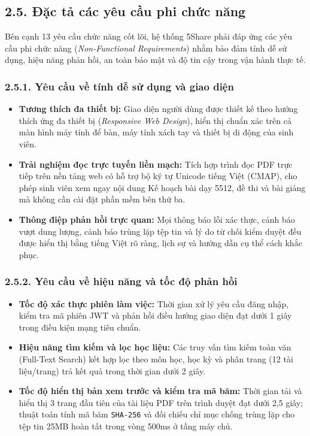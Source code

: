 \subsection{2.5. Đặc tả các yêu cầu phi chức năng}
Bên cạnh 13 yêu cầu chức năng cốt lõi, hệ thống 5Share phải đáp ứng các yêu cầu phi chức năng (\textit{Non-Functional Requirements}) nhằm bảo đảm tính dễ sử dụng, hiệu năng phản hồi, an toàn bảo mật và độ tin cậy trong vận hành thực tế.

\subsubsection{2.5.1. Yêu cầu về tính dễ sử dụng và giao diện}
\begin{itemize}[leftmargin=*,noitemsep]
    \item \textbf{Tương thích đa thiết bị:} Giao diện người dùng được thiết kế theo hướng thích ứng đa thiết bị (\textit{Responsive Web Design}), hiển thị chuẩn xác trên cả màn hình máy tính để bàn, máy tính xách tay và thiết bị di động của sinh viên.
    \item \textbf{Trải nghiệm đọc trực tuyến liền mạch:} Tích hợp trình đọc PDF trực tiếp trên nền tảng web có hỗ trợ bộ ký tự Unicode tiếng Việt (CMAP), cho phép sinh viên xem ngay nội dung Kế hoạch bài dạy 5512, đề thi và bài giảng mà không cần cài đặt phần mềm bên thứ ba.
    \item \textbf{Thông điệp phản hồi trực quan:} Mọi thông báo lỗi xác thực, cảnh báo vượt dung lượng, cảnh báo trùng lặp tệp tin và lý do từ chối kiểm duyệt đều được hiển thị bằng tiếng Việt rõ ràng, lịch sự và hướng dẫn cụ thể cách khắc phục.
\end{itemize}

\subsubsection{2.5.2. Yêu cầu về hiệu năng và tốc độ phản hồi}
\begin{itemize}[leftmargin=*,noitemsep]
    \item \textbf{Tốc độ xác thực phiên làm việc:} Thời gian xử lý yêu cầu đăng nhập, kiểm tra mã phiên JWT và phản hồi điều hướng giao diện đạt dưới 1 giây trong điều kiện mạng tiêu chuẩn.
    \item \textbf{Hiệu năng tìm kiếm và lọc học liệu:} Các truy vấn tìm kiếm toàn văn (Full-Text Search) kết hợp lọc theo môn học, học kỳ và phân trang (12 tài liệu/trang) trả kết quả trong thời gian dưới 2 giây.
    \item \textbf{Tốc độ hiển thị bản xem trước và kiểm tra mã băm:} Thời gian tải và hiển thị 3 trang đầu tiên của tài liệu PDF trên trình duyệt đạt dưới 2,5 giây; thuật toán tính mã băm \texttt{SHA-256} và đối chiếu chỉ mục chống trùng lặp cho tệp tin 25MB hoàn tất trong vòng 500ms ở tầng máy chủ.
\end{itemize}

